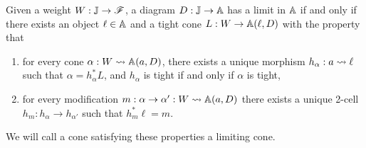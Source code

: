 \documentclass[../thesis.tex]{subfiles}
\begin{document}
\begin{proposition}\label{prop:chr of limits}
  Given a weight $W : {\mathbb{J}} \to {\mathscr{F}}$, a diagram $D : {\mathbb{J}} \to {\mathbb{A}}$ has a limit in ${\mathbb{A}}$ if and only if there
  exists an object $\ell \in {\mathbb{A}}$ and a tight cone $L : W \to {\mathbb{A}}(\ell,D)$ with the property that
  \begin{enumerate}
    \item for every cone $\alpha : W \rightsquigarrow {\mathbb{A}}(a,D)$, there exists a unique morphism $h_\alpha : a \rightsquigarrow
      \ell$ such that $\alpha = h_\alpha^*L$, and $h_\alpha$ is tight if and only if $\alpha$ is tight,
    \item for every modification $m : \alpha \to \alpha' : W \rightsquigarrow {\mathbb{A}}(a,D)$ there exists a unique 2-cell
      $h_m : h_\alpha \to h_{\alpha'}$ such that $h_m^*\ell = m$.
  \end{enumerate}
  We will call a cone satisfying these properties a limiting cone.
\end{proposition}
\end{document}
